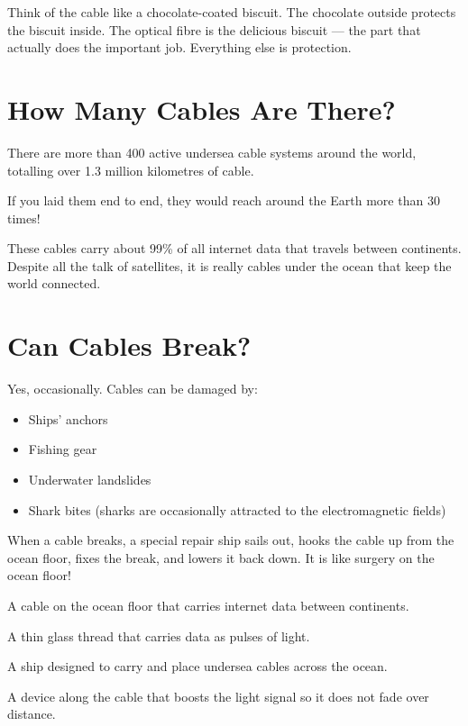 \begin{picturethis}
  Think of the cable like a chocolate-coated biscuit.
  The chocolate outside protects the biscuit inside.
  The optical fibre is the delicious biscuit —
  the part that actually does the important job.
  Everything else is protection.
\end{picturethis}

\sectionrule

\section*{How Many Cables Are There?}

There are more than 400 active undersea cable systems around the world,
totalling over 1.3 million kilometres of cable.

If you laid them end to end, they would reach around the Earth more than 30 times!

These cables carry about 99\% of all internet data that travels between continents.
Despite all the talk of satellites, it is really cables under the ocean that keep the world connected.

\sectionrule

\section*{Can Cables Break?}

Yes, occasionally.
Cables can be damaged by:
\begin{itemize}
  \item Ships' anchors
  \item Fishing gear
  \item Underwater landslides
  \item Shark bites (sharks are occasionally attracted to the electromagnetic fields)
\end{itemize}

When a cable breaks, a special repair ship sails out, hooks the cable up from the ocean floor,
fixes the break, and lowers it back down.
It is like surgery on the ocean floor!

\sectionrule

\begin{newwords}
  \begin{description}[labelwidth=3.8cm, leftmargin=4cm]
    \item[\term{Undersea cable}]    A cable on the ocean floor that carries internet data between continents.
    \item[\term{Optical fibre}]     A thin glass thread that carries data as pulses of light.
    \item[\term{Cable-laying ship}] A ship designed to carry and place undersea cables across the ocean.
    \item[\term{Amplifier}]         A device along the cable that boosts the light signal so it does not fade over distance.
  \end{description}
\end{newwords}

